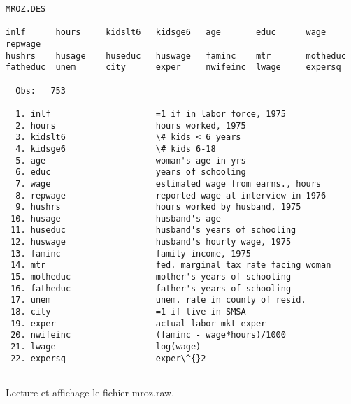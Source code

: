 \documentclass[11pt]{article}
\begin{document}
    \begin{Verbatim}[commandchars=\\\{\}]
MROZ.DES

inlf      hours     kidslt6   kidsge6   age       educ      wage      repwage
hushrs    husage    huseduc   huswage   faminc    mtr       motheduc
fatheduc  unem      city      exper     nwifeinc  lwage     expersq

  Obs:   753

  1. inlf                     =1 if in labor force, 1975
  2. hours                    hours worked, 1975
  3. kidslt6                  \# kids < 6 years
  4. kidsge6                  \# kids 6-18
  5. age                      woman's age in yrs
  6. educ                     years of schooling
  7. wage                     estimated wage from earns., hours
  8. repwage                  reported wage at interview in 1976
  9. hushrs                   hours worked by husband, 1975
 10. husage                   husband's age
 11. huseduc                  husband's years of schooling
 12. huswage                  husband's hourly wage, 1975
 13. faminc                   family income, 1975
 14. mtr                      fed. marginal tax rate facing woman
 15. motheduc                 mother's years of schooling
 16. fatheduc                 father's years of schooling
 17. unem                     unem. rate in county of resid.
 18. city                     =1 if live in SMSA
 19. exper                    actual labor mkt exper
 20. nwifeinc                 (faminc - wage*hours)/1000
 21. lwage                    log(wage)
 22. expersq                  exper\^{}2


    \end{Verbatim}

    Lecture et affichage le fichier mroz.raw.
\end{document}
